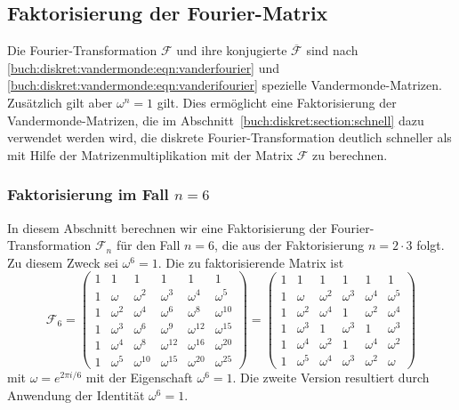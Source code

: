 %
%

%
%
%
\subsection{Faktorisierung der Fourier-Matrix
\label{buch:diskret:subsetion:faktorisierung}}
Die Fourier-Transformation $\mathscr{F}$ und ihre konjugierte
$\overline{\mathscr{F}}$ sind nach
\eqref{buch:diskret:vandermonde:eqn:vanderfourier}
und
\eqref{buch:diskret:vandermonde:eqn:vanderifourier}
spezielle Van\-der\-mon\-de-Matrizen.
Zusätzlich gilt aber $\omega^n=1$ gilt.
Dies ermöglicht eine Faktorisierung der Vandermonde-Matrizen, die
im Abschnitt~\ref{buch:diskret:section:schnell} dazu verwendet
werden wird, die diskrete Fourier-Transformation deutlich schneller
als mit Hilfe der Matrizenmultiplikation mit der Matrix $\mathscr{F}$
zu berechnen.

%
%
\subsubsection{Faktorisierung im Fall $n=6$}
In diesem Abschnitt berechnen wir eine Faktorisierung der
Fourier-Transformation $\mathscr{F}_n$ für den Fall $n=6$,
die aus der Faktorisierung $n=2\cdot 3$ folgt.
Zu diesem Zweck sei $\omega^6=1$.
Die zu faktorisierende Matrix ist
\[
\mathscr{F}_6
=
\begin{pmatrix}
1&       1&          1&          1&          1&          1\\
1&  \omega&   \omega^2&   \omega^3&   \omega^4&   \omega^5\\
1&\omega^2&   \omega^4&   \omega^6&   \omega^8&\omega^{10}\\
1&\omega^3&   \omega^6&   \omega^9&\omega^{12}&\omega^{15}\\
1&\omega^4&   \omega^8&\omega^{12}&\omega^{16}&\omega^{20}\\
1&\omega^5&\omega^{10}&\omega^{15}&\omega^{20}&\omega^{25}
\end{pmatrix}
=
\begin{pmatrix}
1&       1&       1&       1&       1&       1\\
1&  \omega&\omega^2&\omega^3&\omega^4&\omega^5\\
1&\omega^2&\omega^4&       1&\omega^2&\omega^4\\
1&\omega^3&       1&\omega^3&       1&\omega^3\\
1&\omega^4&\omega^2&       1&\omega^4&\omega^2\\
1&\omega^5&\omega^4&\omega^3&\omega^2&\omega
\end{pmatrix}
\]
mit $\omega = e^{2\pi i/6}$ mit der Eigenschaft $\omega^6=1$.
Die zweite Version resultiert durch Anwendung der Identität $\omega^6=1$.

